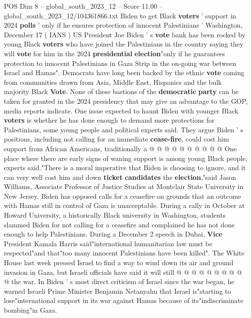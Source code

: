 \begin{textsample}{POS Dim 8 – global\_south\_2023\_12 – Score 11.00 – global\_south\_2023\_12/104361866.txt}  \label{ex:f8_pos_229}
Biden to get Black \textbf{voters} ' support in 2024 \textbf{polls} ' only if he ensures protection of innocent Palestinians ' Washington, December 17 ( IANS ) US President Joe Biden ' s \textbf{vote} bank has been rocked by young Black \textbf{voters} who have joined the Palestinians in the country saying they will \textbf{vote} for him in the 2024 \textbf{presidential} \textbf{election}"only if he guarantees protection to innocent Palestinians in Gaza Strip in the on-going war between Israel and Hamas".
Democrats have long been backed by the ethnic \textbf{vote} coming from communities drawn from Asia, Middle East, Hispanics and the bulk majority Black \textbf{Vote}.
None of these bastions of the \textbf{democratic} \textbf{party} can be taken for granted in the 2024 presidency that may give an advantage to the GOP, media reports indicate.
One issue expected to haunt Biden with younger Black \textbf{voters} is whether he has done enough to demand more protections for Palestinians, some young people and political experts said.
They argue Biden ' s positions, including not calling for an immediate \textbf{cease-fire}, could cost him support from African Americans, traditionally a @ @ @ @ @ @ @ @ @ @ One place where there are early signs of waning support is among young Black people, experts said."There is a moral imperative that Biden is choosing to ignore, and it can very well cost him and down \textbf{ticket} \textbf{candidates} the \textbf{election},"said Jason Williams, Associate Professor of Justice Studies at Montclair State University in New Jersey.
Biden has opposed calls for a ceasefire on grounds that an outcome with Hamas still in control of Gaza is unacceptable.
During a rally in October at Howard University, a historically Black university in Washington, students slammed Biden for not calling for a ceasefire and complained he has not done enough to help Palestinians.
During a December 2 speech in Dubai, \textbf{Vice} President Kamala Harris said"international humanitarian law must be respected"and that"too many innocent Palestinians have been killed".
The White House last week pressed Israel to find a way to wind down its air and ground invasion in Gaza, but Israeli officials have said it will still @ @ @ @ @ @ @ @ @ @ the war.
In Biden ' s most direct criticism of Israel since the war began, he warned Israeli Prime Minister Benjamin Netanyahu that Israel is"starting to lose"international support in its war against Hamas because of its"indiscriminate bombing"in Gaza.

\end{textsample}

